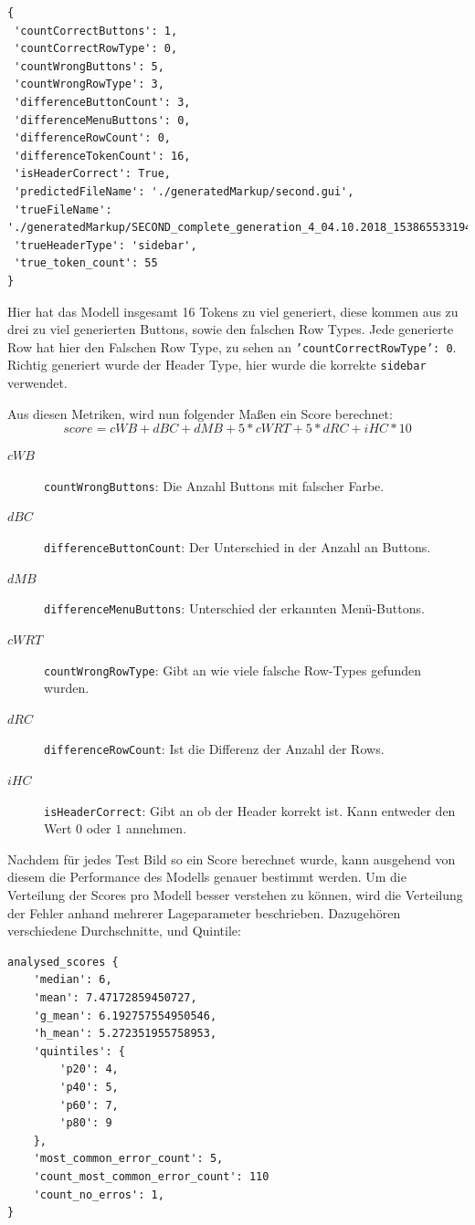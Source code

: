 \documentclass[pdftex,a4paper,halfparskip, article]{scrartcl}
\begin{document}
\begin{verbatim}
{
 'countCorrectButtons': 1,
 'countCorrectRowType': 0,
 'countWrongButtons': 5,
 'countWrongRowType': 3,
 'differenceButtonCount': 3,
 'differenceMenuButtons': 0,
 'differenceRowCount': 0,
 'differenceTokenCount': 16,
 'isHeaderCorrect': True,
 'predictedFileName': './generatedMarkup/second.gui',
 'trueFileName': './generatedMarkup/SECOND_complete_generation_4_04.10.2018_1538655331945.gui',
 'trueHeaderType': 'sidebar',
 'true_token_count': 55
}
\end{verbatim}


Hier hat das Modell insgesamt 16 Tokens zu viel generiert, diese kommen aus zu drei zu viel generierten Buttons, sowie den falschen Row Types. Jede generierte Row hat hier den Falschen Row Type, zu sehen an \texttt{'countCorrectRowType': 0}. Richtig generiert wurde der Header Type, hier wurde die korrekte \texttt{sidebar} verwendet.

Aus diesen Metriken, wird nun folgender Maßen ein Score berechnet:        
\begin{equation}
score = cWB + dBC + dMB + 5 * cWRT + 5 * dRC + iHC * 10
\end{equation}

\begin{description}
	\item[$cWB$] \texttt{countWrongButtons}: Die Anzahl Buttons mit falscher Farbe.
	\item[$dBC$] \texttt{differenceButtonCount}: Der Unterschied in der Anzahl an Buttons.
	\item[$dMB$] \texttt{differenceMenuButtons}: Unterschied der erkannten Menü-Buttons.
	\item[$cWRT$] \texttt{countWrongRowType}: Gibt an wie viele falsche Row-Types gefunden wurden.
	\item[$dRC$] \texttt{differenceRowCount}: Ist die Differenz der Anzahl der Rows.
	\item[$iHC$] \texttt{isHeaderCorrect}: Gibt an ob der Header korrekt ist. Kann entweder den Wert $0$ oder $1$ annehmen.	
\end{description}

Nachdem für jedes Test Bild so ein Score berechnet wurde, kann ausgehend von diesem die Performance des Modells genauer bestimmt werden. Um die Verteilung der Scores pro Modell besser verstehen zu können, wird die Verteilung der Fehler anhand mehrerer Lageparameter beschrieben. Dazugehören verschiedene Durchschnitte, und Quintile:

  \begin{verbatim}
analysed_scores {
    'median': 6, 
    'mean': 7.47172859450727, 
    'g_mean': 6.192757554950546, 
    'h_mean': 5.272351955758953, 
    'quintiles': {
        'p20': 4,
        'p40': 5, 
        'p60': 7, 
        'p80': 9 
	},
    'most_common_error_count': 5, 
    'count_most_common_error_count': 110
    'count_no_erros': 1, 
}
 \end{verbatim}
\end{document}
